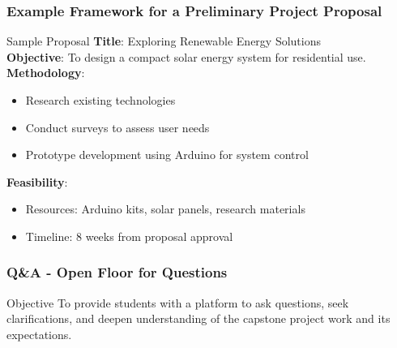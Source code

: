 \documentclass[aspectratio=169]{beamer}
\begin{document}
\begin{frame}[fragile]
    \frametitle{Example Framework for a Preliminary Project Proposal}
    \begin{block}{Sample Proposal}
        \textbf{Title}: Exploring Renewable Energy Solutions\\
        \textbf{Objective}: To design a compact solar energy system for residential use.\\
        \textbf{Methodology}:
        \begin{itemize}
            \item Research existing technologies
            \item Conduct surveys to assess user needs
            \item Prototype development using Arduino for system control
        \end{itemize}
        \textbf{Feasibility}:
        \begin{itemize}
            \item Resources: Arduino kits, solar panels, research materials
            \item Timeline: 8 weeks from proposal approval
        \end{itemize}
    \end{block}
\end{frame}

\begin{frame}[fragile]
    \frametitle{Q\&A - Open Floor for Questions}
    \begin{block}{Objective}
        To provide students with a platform to ask questions, seek clarifications, and deepen understanding of the capstone project work and its expectations.
    \end{block}
\end{frame}
\end{document}
